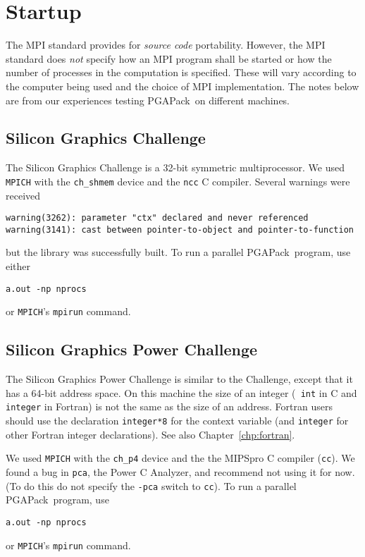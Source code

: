 \documentclass{report}
\newcommand{\pga}{PGAPack}
\begin{document}
\section*{Startup}



The MPI standard provides for {\em source code} portability.  However, the MPI
standard does {\em not} specify how an MPI program shall be started or how the
number of processes in the computation is specified.  These will vary
according to the computer being used and the choice of MPI implementation.
The notes below are from our experiences testing \pga\ on different machines.


\subsection*{Silicon Graphics Challenge}

The Silicon Graphics Challenge is a 32-bit symmetric multiprocessor.  We used
{\tt MPICH} with the {\tt ch\_shmem} device and the {\tt ncc} C compiler.
Several warnings were received
\begin{verbatim}
warning(3262): parameter "ctx" declared and never referenced
warning(3141): cast between pointer-to-object and pointer-to-function
\end{verbatim}
but the library was successfully built.
To run a parallel \pga\ program, use either
\begin{verbatim}
a.out -np nprocs
\end{verbatim}
or {\tt MPICH}'s {\tt mpirun} command.


\subsection*{Silicon Graphics Power Challenge}

The Silicon Graphics Power Challenge is similar to the Challenge, except that
it has a 64-bit address space.  On this machine the size of an integer ({\tt
int} in C and {\tt integer} in Fortran) is not the same as the size of an
address.  Fortran users should use the declaration {\tt integer*8} for the
context variable (and {\tt integer} for other Fortran integer declarations).
See also Chapter~\ref{chp:fortran}.

We used {\tt MPICH} with the {\tt ch\_p4} device and the the MIPSpro C
compiler ({\tt cc}).  We found a bug in {\tt pca}, the Power C Analyzer, and
recommend not using it for now.  (To do this do
not specify the {\tt -pca} switch to {\tt cc}).  To run a parallel \pga\
program, use
\begin{verbatim}
a.out -np nprocs
\end{verbatim}
or {\tt MPICH}'s {\tt mpirun} command.
\end{document}
